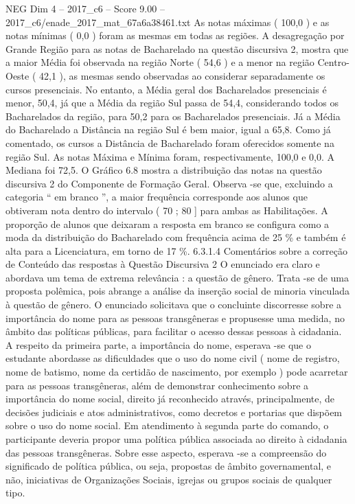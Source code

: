 \begin{textsample}{NEG Dim 4 – 2017\_c6 – Score 9.00 – 2017\_c6/enade\_2017\_mat\_67a6a38461.txt}
As notas máximas ( 100,0 ) e as notas mínimas ( 0,0 ) foram as mesmas em todas as regiões.
A desagregação por Grande Região para as notas de Bacharelado na questão discursiva 2, mostra que a maior Média foi observada na região Norte ( 54,6 ) e a menor na região Centro-Oeste ( 42,1 ), as mesmas sendo observadas ao considerar separadamente os cursos presenciais.
No entanto, a Média geral dos Bacharelados presenciais é menor, 50,4, já que a Média da região Sul passa de 54,4, considerando todos os Bacharelados da região, para 50,2 para os Bacharelados presenciais.
Já a Média do Bacharelado a Distância na região Sul é bem maior, igual a 65,8.
Como já comentado, os cursos a Distância de Bacharelado foram oferecidos somente na região Sul.
As notas Máxima e Mínima foram, respectivamente, 100,0 e 0,0.
A Mediana foi 72,5.
O Gráfico 6.8 mostra a distribuição das notas na questão discursiva 2 do Componente de Formação Geral.
Observa -se que, excluindo a categoria “ em branco ”, a maior frequência corresponde aos alunos que obtiveram nota dentro do intervalo ( 70 ; 80 ] para ambas as Habilitações.
A proporção de alunos que deixaram a resposta em branco se configura como a moda da distribuição do Bacharelado com frequência acima de 25 \% e também é alta para a Licenciatura, em torno de 17 \%. 6.3.1.4 Comentários sobre a correção de Conteúdo das respostas à Questão Discursiva 2 O enunciado era claro e abordava um tema de extrema relevância : a questão de gênero.
Trata -se de uma proposta polêmica, pois abrange a análise da inserção social de minoria vinculada à questão de gênero.
O enunciado solicitava que o concluinte discorresse sobre a importância do nome para as pessoas transgêneras e propusesse uma medida, no âmbito das políticas públicas, para facilitar o acesso dessas pessoas à cidadania.
A respeito da primeira parte, a importância do nome, esperava -se que o estudante abordasse as dificuldades que o uso do nome civil ( nome de registro, nome de batismo, nome da certidão de nascimento, por exemplo ) pode acarretar para as pessoas transgêneras, além de demonstrar conhecimento sobre a importância do nome social, direito já reconhecido através, principalmente, de decisões judiciais e atos administrativos, como decretos e portarias que dispõem sobre o uso do nome social.
Em atendimento à segunda parte do comando, o participante deveria propor uma política pública associada ao direito à cidadania das pessoas transgêneras.
Sobre esse aspecto, esperava -se a compreensão do significado de política pública, ou seja, propostas de âmbito governamental, e não, iniciativas de Organizações Sociais, igrejas ou grupos sociais de qualquer tipo.

\end{textsample}

